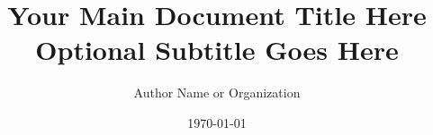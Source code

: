 \newcommand{\zoomedImage}[9][]{%
  \begin{figure}[htbp]
    \centering
    \begin{tikzpicture}
      \node[inner sep=0pt] (image) {%
        \imageWithFallback[#1]{#2}{#3}{#9}%
      };
      \draw[red, thick] (#4,#5) rectangle ++(#6,#6);
      \begin{scope}[shift={(5cm,0)}]
        \draw[thick] (0,0) circle (1.5cm);
        \clip (0,0) circle (1.5cm);
        \node[inner sep=0pt] at (0,0) {%
          \imageWithFallback[#1]{#2}{#3*#7}{#9}%
        };
      \end{scope}
    \end{tikzpicture}
    \ifx&#8&%
    \else
      \caption{#8}
    \fi
  \end{figure}
}

\newcommand{\imageGrid}[7]{%
  \begin{figure}[htbp]
    \centering
    \begin{tabular}{cc}
      \imageWithFallback[width=#5/2-4pt]{#1}{#5/2-4pt}{#7} &
      \imageWithFallback[width=#5/2-4pt]{#2}{#5/2-4pt}{#7} \\
      \imageWithFallback[width=#5/2-4pt]{#3}{#5/2-4pt}{#7} &
      \imageWithFallback[width=#5/2-4pt]{#4}{#5/2-4pt}{#7} \\
    \end{tabular}
    \ifx&#6&%
    \else
      \caption{#6}
    \fi
  \end{figure}
}

\usepackage{titling}
\pretitle{
    \begin{center}
    \vspace{0.5in}
    \color{primary}\Huge\bfseries\sffamily
}
\posttitle{
    \end{center}
    \vspace{0.3in}
    \begin{center}
    \color{border}\rule{0.6\textwidth}{2pt}
    \end{center}
    \vspace{0.2in}
}
\preauthor{\begin{center}\color{secondary}\large\sffamily}
\postauthor{\end{center}}
\predate{\begin{center}\color{textgray}\large\sffamily}
\postdate{\end{center}\vspace{0.5in}}

\title{Your Main Document Title Here\\[0.3em]Optional Subtitle Goes Here}
\author{Author Name or Organization}
\date{\today} %